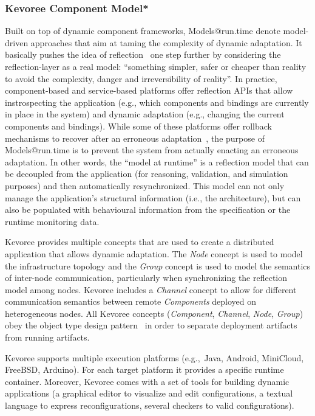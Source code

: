 \subsubsection{Kevoree Component Model*}
Built on top of dynamic component frameworks, Models@run.time denote model-driven approaches that aim at taming the complexity of dynamic adaptation.
It basically pushes the idea of reflection~\cite{morin09a} one step further by considering the reflection-layer as a real model: ``something simpler, safer or cheaper than reality to avoid the complexity, danger and irreversibility of reality''.
In practice, component-based and service-based platforms offer reflection APIs that allow instrospecting the application (e.g., which components and bindings are currently in place in the system) and dynamic adaptation (e.g., changing the current components and bindings).
While some of these platforms offer rollback mechanisms to recover after an erroneous adaptation~\cite{leger2010reliable}, the purpose of Models@run.time is to prevent the system from actually enacting an erroneous adaptation. 
In other words, the ``model at runtime'' is a reflection model that can be decoupled from the application (for reasoning, validation, and simulation purposes) and then automatically resynchronized.
This model can not only manage the application's structural information (i.e., the architecture), but can also be populated with behavioural information from the specification or the runtime monitoring data.

Kevoree provides multiple concepts that are used to create a distributed application that allows dynamic adaptation. The \emph{Node} concept is used to model the infrastructure topology and the \emph{Group} concept is used to model the semantics of inter-node communication, particularly when synchronizing the reflection model among nodes. 
Kevoree includes a \emph{Channel} concept to allow for different communication semantics between remote \emph{Components} deployed on heterogeneous nodes. 
All Kevoree concepts (\textit{Component}, \textit{Channel}, \textit{Node}, \textit{Group}) obey the object type design pattern~\cite{johnson_type_1997} in order to separate deployment artifacts from running artifacts.  

Kevoree supports multiple execution platforms (e.g.,~Java, Android, MiniCloud, FreeBSD, Arduino). For each target platform it provides a specific runtime container. 
Moreover, Kevoree comes with a set of tools for building dynamic applications (a graphical editor to visualize and edit configurations, a textual language to express reconfigurations, several checkers to valid configurations). 


